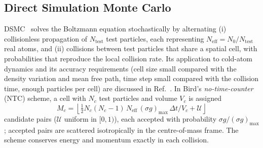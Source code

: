 \documentclass[11pt,a4paper]{article}
\newcommand{\Neff}{N_\mathrm{eff}}
\begin{document}
\subsection{Direct Simulation Monte Carlo}
DSMC~\cite{Bird1994} solves the Boltzmann equation stochastically by alternating (i) collisionless propagation of $N_\mathrm{test}$ test particles, each representing $\Neff=N_0/N_\mathrm{test}$ real atoms, and (ii) collisions between test particles that share a spatial cell, with probabilities that reproduce the local collision rate. Its application to cold-atom dynamics and its accuracy requirements (cell size small compared with the density variation and mean free path, time step small compared with the collision time, enough particles per cell) are discussed in Ref.~\cite{Wade2011}. In Bird's \emph{no-time-counter} (NTC) scheme, a cell with $N_c$ test particles and volume $V_c$ is assigned
\begin{equation}
M_c=\left\lfloor\tfrac12 N_c(N_c-1)\,\Neff\,(\sigma g)_\mathrm{max}\,\Delta t/V_c+\mathcal U\right\rfloor
\end{equation}
candidate pairs ($\mathcal U$ uniform in $[0,1)$), each accepted with probability $\sigma g/(\sigma g)_\mathrm{max}$; accepted pairs are scattered isotropically in the centre-of-mass frame. The scheme conserves energy and momentum exactly in each collision.
\end{document}
